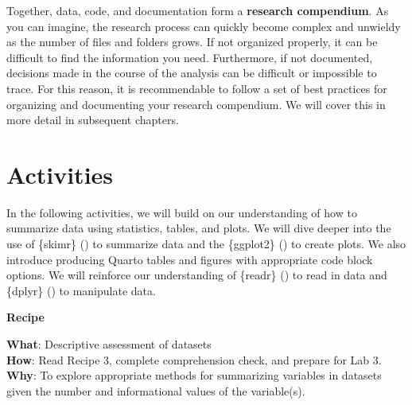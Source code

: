\documentclass[
  letterpaper,
  krantz1]{latex/krantz-mod}
\theoremstyle{definition}
\theoremstyle{definition}
\theoremstyle{remark}
\begin{document}
Together, data, code, and documentation form a \textbf{research
compendium}. As you can imagine, the research
process can quickly become complex and unwieldy as the number of files
and folders grows. If not organized properly, it can be difficult to
find the information you need. Furthermore, if not documented, decisions
made in the course of the analysis can be difficult or impossible to
trace. For this reason, it is recommendable to follow a set of best
practices for organizing and documenting your research compendium. We
will cover this in more detail in subsequent chapters.

\section*{Activities}\label{activities-1}


In the following activities, we will build on our understanding of how
to summarize data using statistics, tables, and plots. We will dive
deeper into the use of \{skimr\} () to summarize data and the \{ggplot2\}
() to create
plots. We also introduce producing Quarto tables and figures with
appropriate code block options. We will reinforce our understanding of
\{readr\} () to
read in data and \{dplyr\} () to manipulate data.

\begin{tcolorbox}[enhanced jigsaw, toprule=.15mm, breakable, colback=white, arc=.35mm, left=2mm, colframe=quarto-callout-color-frame, opacityback=0, bottomrule=.15mm, rightrule=.15mm, leftrule=.75mm]

\textbf{ Recipe}

\textbf{What}: Descriptive assessment of datasets\\
\textbf{How}: Read Recipe 3, complete comprehension check, and prepare
for Lab 3.\\
\textbf{Why}: To explore appropriate methods for summarizing variables
in datasets given the number and informational values of the
variable(s).

\end{tcolorbox}
\end{document}
